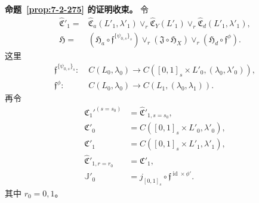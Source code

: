 
\noindent\textbf{命题~\ref{prop:7-2-275} 的证明收束。}
令
\[
\begin{aligned}
\widehat{\mathfrak C}'_1
={}&\widehat{\mathfrak C}_a(L'_1,\lambda'_1)
\vee_r\widehat{\mathfrak C}_Y(L'_1)
\vee_r\widehat{\mathfrak C}_d(L'_1,\lambda'_1),\\
\mathfrak H
={}&(\mathfrak H_a\circ
\mathfrak f^{\{\psi_{0,s}\}_s})
\vee_r(\mathfrak J\circ\mathfrak H_X)
\vee_r(\mathfrak H_d\circ\mathfrak f^\phi).
\end{aligned}
\]
这里
\[
\begin{aligned}
\mathfrak f^{\{\psi_{0,s}\}_s}\colon\;&
C(L_0,\lambda_0)
\longrightarrow C([0,1]_s\times L'_0,
(\lambda_0,\lambda'_0)),\\
\mathfrak f^\phi\colon\;&
C(L_0,\lambda_0)
\longrightarrow C(L_1,(\lambda_0,\lambda_1)).
\end{aligned}
\]
再令
\[
\begin{aligned}
\mathfrak C_1'^{(s=s_0)}
&=\widehat{\mathfrak C}'_{1,s=s_0},\\
\mathfrak C'_0
&=C([0,1]_s\times L'_0,\lambda'_0),\\
\mathfrak C'_1
&=C([0,1]_s\times L'_1,\lambda'_1),\\
\widehat{\mathfrak C}'_{1,r=r_0}
&=\mathfrak C'_1,\\
\mathbb J'_0
&=j_{[0,1]_s}\circ
\mathfrak f^{\operatorname{id}\times\phi'}.
\end{aligned}
\]
其中 $r_0=0,1$。

